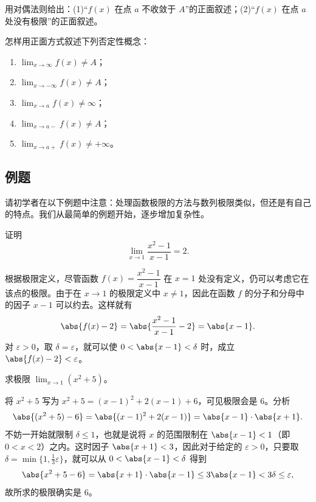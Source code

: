 \begin{xthought}[3]
用对偶法则给出：(1)“$f(x)$ 在点 $a$ 不收敛于 $A$”的正面叙述；(2)“$f(x)$ 在点 $a$ 处没有极限”的正面叙述。
\end{xthought}

\begin{xthought}[4]
怎样用正面方式叙述下列否定性概念：
  \begin{enumerate}[label=(\arabic*)]
    \item $\lim_{x\to\infty}f(x)\ne A$；
    \item $\lim_{x\to-\infty}f(x)\ne A$；
    \item $\lim_{x\to a}f(x)\ne\infty$；
    \item $\lim_{x\to a-}f(x)\ne A$；
    \item $\lim_{x\to a+}f(x)\ne+\infty$。
  \end{enumerate}
\end{xthought}

\subsection{例题}

请初学者在以下例题中注意：处理函数极限的方法与数列极限类似，但还是有自己的特点。我们从最简单的例题开始，逐步增加复杂性。

\begin{xexample}[4.1.1]
证明
\[
  \lim_{x\to1}\frac{x^2-1}{x-1}=2.
\]
\end{xexample}
\begin{xproof}
根据极限定义，尽管函数 $f(x)=\dfrac{x^2-1}{x-1}$ 在 $x=1$ 处没有定义，仍可以考虑它在该点的极限。由于在 $x\to1$ 的极限定义中 $x\ne1$，因此在函数 $f$ 的分子和分母中的因子 $x-1$ 可以约去。这样就有
\[
  \abs{f(x)-2}=\abs{\frac{x^2-1}{x-1}-2}=\abs{x-1}.
\]
对 $\varepsilon>0$，取 $\delta=\varepsilon$，就可以使 $0<\abs{x-1}<\delta$ 时，成立 $\abs{f(x)-2}<\varepsilon$。
\end{xproof}

\begin{xexample}[4.1.2]
求极限 $\lim_{x\to1}(x^2+5)$。
\end{xexample}
\begin{xsolution}
将 $x^2+5$ 写为 $x^2+5=(x-1)^2+2(x-1)+6$，可见极限会是 6。分析
\[
  \abs{(x^2+5)-6}=\abs{(x-1)^2+2(x-1)}=\abs{x-1}\cdot\abs{x+1}.
\]
不妨一开始就限制 $\delta\leq1$，也就是说将 $x$ 的范围限制在 $\abs{x-1}<1$（即 $0<x<2$）之内。这时因子 $\abs{x+1}<3$，因此对于给定的 $\varepsilon>0$，只要取 $\delta=\min\{1,\frac13\varepsilon\}$，就可以从 $0<\abs{x-1}<\delta$ 得到
\[
  \abs{x^2+5-6}=\abs{x+1}\cdot\abs{x-1}\leq3\abs{x-1}<3\delta\leq\varepsilon,
\]
故所求的极限确实是 6。
\end{xsolution}

